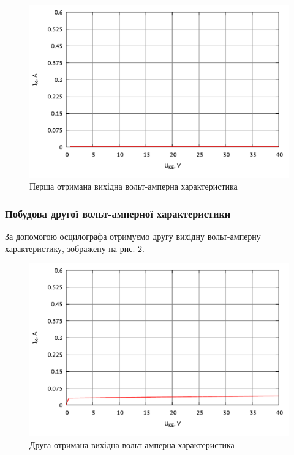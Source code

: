 \documentclass[a4paper,oneside,12pt,DIV=12,titlepage]{scrartcl}
\begin{document}
				\begin{figure}[h]
					\centering
					\includegraphics[width=0.45\textheight]{graph004.pdf}
					\caption{Перша отримана вихідна вольт-амперна характеристика}
					\label{fig:graph004}
				\end{figure}
				
			\subsubsection{Побудова другої вольт-амперної характеристики}
				За допомогою осцилографа отримуємо другу вихідну вольт-амперну характеристику, зображену на рис. \ref{fig:graph005}.
				
				\begin{figure}[h]
					\centering
					\includegraphics[width=0.45\textheight]{graph005.pdf}
					\caption{Друга отримана вихідна вольт-амперна характеристика}
					\label{fig:graph005}
				\end{figure}
				
\end{document}
